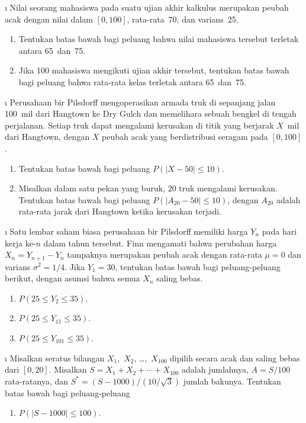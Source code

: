 {\begin{LJSItem}
\i\label{exer 8.2.106} Nilai seorang mahasiswa pada suatu ujian akhir kalkulus merupakan peubah acak
dengan nilai dalam $[0,100]$, rata-rata~70, dan varians~25.
\begin{enumerate}
\item Tentukan batas bawah bagi peluang bahwa nilai mahasiswa tersebut
terletak antara 65~dan~75.

\item Jika 100 mahasiswa mengikuti ujian akhir tersebut, tentukan batas bawah bagi peluang
bahwa rata-rata kelas terletak antara 65~dan~75.
\end{enumerate}

\i\label{exer 8.2.107} Perusahaan bir Pilsdorff mengoperasikan armada truk di sepanjang jalan
100~mil dari Hangtown ke Dry Gulch dan memelihara sebuah bengkel di tengah perjalanan. 
Setiap truk dapat mengalami kerusakan di titik yang berjarak $X$~mil dari Hangtown,
dengan $X$ peubah acak yang berdistribusi seragam pada $[0,100]$.
\begin{enumerate}
\item Tentukan batas bawah bagi peluang $P(|X - 50| \leq 10)$.

\item Misalkan dalam satu pekan yang buruk, 20 truk mengalami kerusakan.  Tentukan batas bawah
bagi peluang $P(|A_{20} - 50| \leq 10)$, dengan $A_{20}$ adalah rata-rata
jarak dari Hangtown ketika kerusakan terjadi.
\end{enumerate}

\i\label{exer 8.2.12} Satu lembar saham biasa perusahaan bir Pilsdorff
memiliki harga $Y_n$ pada hari kerja ke-$n$ dalam tahun tersebut.  Finn mengamati bahwa
perubahan harga $X_n = Y_{n + 1} - Y_n$ tampaknya merupakan peubah acak dengan rata-rata
$\mu = 0$ dan varians $\sigma^2 =1/4$.  Jika $Y_1 = 30$, tentukan batas bawah bagi
peluang-peluang berikut, dengan asumsi bahwa semua $X_n$ saling bebas.
\begin{enumerate}
\item $P(25 \leq Y_2 \leq 35)$.

\item $P(25 \leq Y_{11} \leq 35)$.

\item $P(25 \leq Y_{101} \leq 35)$.
\end{enumerate}

\i\label{exer 8.2.108} Misalkan seratus bilangan $X_1$,~$X_2$, \dots,~$X_{100}$ dipilih
secara acak dan saling bebas dari $[0,20]$.  Misalkan $S = X_1 + X_2 +\cdots+ X_{100}$
adalah jumlahnya, $A = S/100$ rata-ratanya, dan $S^* = (S - 1000)/(10/\sqrt3)$ jumlah
bakunya.  Tentukan batas bawah bagi peluang-peluang
\begin{enumerate}
\item $P(|S - 1000| \leq 100)$.


\end{enumerate}
\end{LJSItem}}
